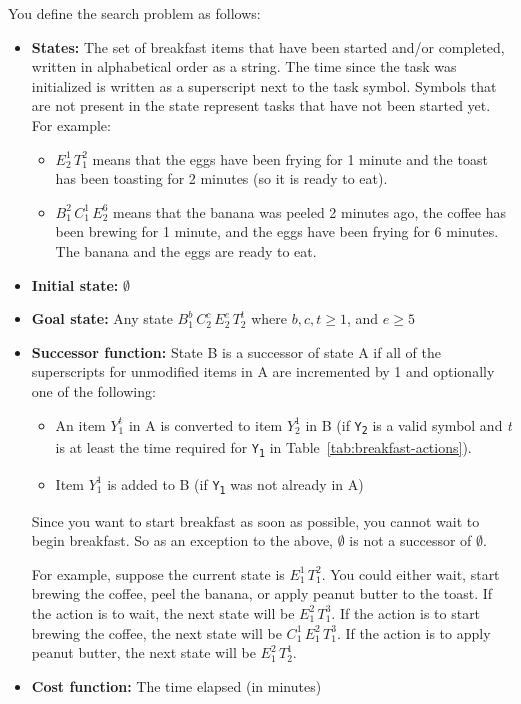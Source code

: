 \documentclass[12pt]{article}
\begin{document}
You define the search problem as follows:

\begin{itemize}
    \item \textbf{States:} The set of breakfast items that have been started and/or completed, written in alphabetical order as a string. The time since the task was initialized is written as a superscript next to the task symbol. Symbols that are not present in the state represent tasks that have not been started yet. For example:
    \begin{itemize}
        \item $E_2^1\,T_1^2$ means that the eggs have been frying for 1 minute and the toast has been toasting for 2 minutes (so it is ready to eat).
        \item $B_1^2\,C_1^1\,E_2^6$ means that the banana was peeled 2 minutes ago, the coffee has been brewing for 1 minute, and the eggs have been frying for 6 minutes. The banana and the eggs are ready to eat.
    \end{itemize}
    \item \textbf{Initial state:} $\emptyset$  
    \item \textbf{Goal state:} Any state $B_1^b\,C_2^c\,E_2^e\,T_2^t$ where $b,c,t \geq 1$, and $e \geq 5$
    \item \textbf{Successor function:} State B is a successor of state A if all of the superscripts for unmodified items in A are incremented by 1 and optionally one of the following:
    \begin{itemize}
        \item An item $Y_1^t$ in A is converted to item $Y_2^1$ in B (if \texttt{Y\textsubscript{2}} is a valid symbol and \textit{t} is at least the time required for \texttt{Y\textsubscript{1}} in Table~\ref{tab:breakfast-actions}).
        \item Item $Y_1^1$ is added to B (if \texttt{Y\textsubscript{1}} was not already in A)
    \end{itemize}
    
    Since you want to start breakfast as soon as possible, you cannot wait to begin breakfast. So as an exception to the above, $\emptyset$ is not a successor of $\emptyset$.
    
    For example, suppose the current state is $E_1^1\,T_1^2$. You could either wait, start brewing the coffee, peel the banana, or apply peanut butter to the toast. If the action is to wait, the next state will be $E_1^2\,T_1^3$. If the action is to start brewing the coffee, the next state will be $C_1^1\,E_1^2\,T_1^3$. If the action is to apply peanut butter, the next state will be $E_1^2\,T_2^1$.
    \item \textbf{Cost function:} The time elapsed (in minutes)
\end{itemize}
\end{document}

